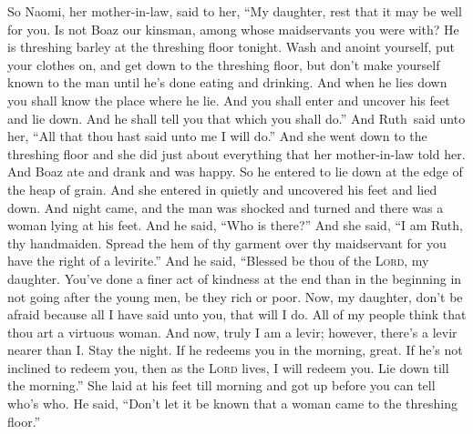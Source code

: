 
\begin{inparaenum}
     So Naomi, her mother-in-law, said to her, ``My daughter, rest that it may be well for you.%
     Is not Boaz our kinsman, among whose maidservants you were with? He is threshing barley at the threshing floor tonight.%
     Wash and anoint yourself, put your clothes on, and get down to the threshing floor, but don't make yourself known to the man until he's done eating and drinking.%
     And when he lies down you shall know the place where he lie. And you shall enter and uncover his feet and lie down. And he shall tell you that which you shall do.''%
     And Ruth\understood\ said unto her, ``All that thou hast said unto me I will do.''%
     And she went down to the threshing floor and she did just about everything that her mother-in-law told her.%
     And Boaz ate and drank and was happy. So he entered to lie down at the edge of the heap of grain. And she entered in quietly and uncovered his feet and lied down.%
     And night came, and the man was shocked and turned and there was a woman lying at his feet.%
     And he said, ``Who is there?'' And she said, ``I am Ruth, thy handmaiden. Spread the hem of thy garment over thy maidservant for you have the right of a levirite.''%
     And he said, ``Blessed be thou of the \textsc{Lord}, my daughter. You've done a finer act of kindness at the end than in the beginning in not going after the young men, be they rich or poor.%
     Now, my daughter, don't be afraid because all I have said unto you, that will I do. All of my people think that thou art a virtuous woman.%
     And now, truly I am a levir; however, there's a levir nearer than I.%
     Stay the night. If he redeems you in the morning, great. If he's not inclined to redeem you, then as the \textsc{Lord} lives, I will redeem you. Lie down till the morning.''%
     She laid at his feet till morning and got up before you can tell who's who. He said, ``Don't let it be known that a woman came to the threshing floor.''%

\end{inparaenum}

